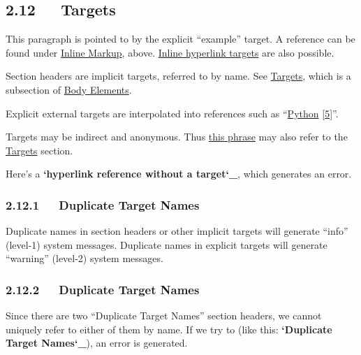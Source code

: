 \documentclass[10pt,english]{article}
\begin{document}

\hypertarget{targets}{}
\subsection*{2.12~~~Targets}
\hypertarget{example}{}
This paragraph is pointed to by the explicit ``example'' target. A
reference can be found under \href{\#inline-markup}{Inline Markup}, above. \href{\#inline-hyperlink-targets}{Inline
hyperlink targets} are also possible.

Section headers are implicit targets, referred to by name. See
\href{\#targets}{Targets}, which is a subsection of \href{\#body-elements}{Body Elements}.

Explicit external targets are interpolated into references such as
``\href{http://www.python.org/}{Python} [\hyperlink{id21}{5}]''.

Targets may be indirect and anonymous.  Thus \href{\#targets}{this phrase} may also
refer to the \href{\#targets}{Targets} section.

Here's a {\color{red}\bfseries{}`hyperlink reference without a target`{\_}}, which generates an
error.



\hypertarget{duplicate-target-names}{}
\subsubsection*{2.12.1~~~Duplicate Target Names}

Duplicate names in section headers or other implicit targets will
generate ``info'' (level-1) system messages.  Duplicate names in
explicit targets will generate ``warning'' (level-2) system messages.



\hypertarget{id18}{}
\subsubsection*{2.12.2~~~Duplicate Target Names}

Since there are two ``Duplicate Target Names'' section headers, we
cannot uniquely refer to either of them by name.  If we try to (like
this: {\color{red}\bfseries{}`Duplicate Target Names`{\_}}), an error is generated.
\end{document}
